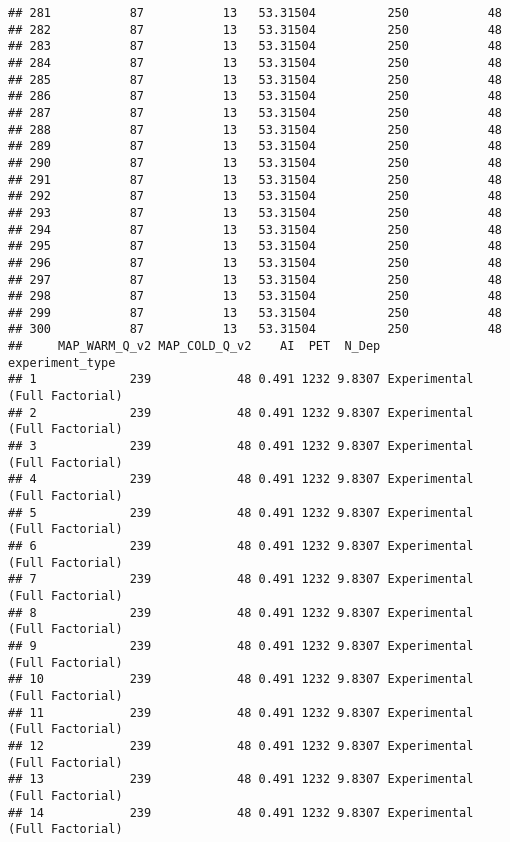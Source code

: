 \documentclass[]{article}
\begin{document}
\begin{verbatim}
## 281           87           13   53.31504          250           48
## 282           87           13   53.31504          250           48
## 283           87           13   53.31504          250           48
## 284           87           13   53.31504          250           48
## 285           87           13   53.31504          250           48
## 286           87           13   53.31504          250           48
## 287           87           13   53.31504          250           48
## 288           87           13   53.31504          250           48
## 289           87           13   53.31504          250           48
## 290           87           13   53.31504          250           48
## 291           87           13   53.31504          250           48
## 292           87           13   53.31504          250           48
## 293           87           13   53.31504          250           48
## 294           87           13   53.31504          250           48
## 295           87           13   53.31504          250           48
## 296           87           13   53.31504          250           48
## 297           87           13   53.31504          250           48
## 298           87           13   53.31504          250           48
## 299           87           13   53.31504          250           48
## 300           87           13   53.31504          250           48
##     MAP_WARM_Q_v2 MAP_COLD_Q_v2    AI  PET  N_Dep               experiment_type
## 1             239            48 0.491 1232 9.8307 Experimental (Full Factorial)
## 2             239            48 0.491 1232 9.8307 Experimental (Full Factorial)
## 3             239            48 0.491 1232 9.8307 Experimental (Full Factorial)
## 4             239            48 0.491 1232 9.8307 Experimental (Full Factorial)
## 5             239            48 0.491 1232 9.8307 Experimental (Full Factorial)
## 6             239            48 0.491 1232 9.8307 Experimental (Full Factorial)
## 7             239            48 0.491 1232 9.8307 Experimental (Full Factorial)
## 8             239            48 0.491 1232 9.8307 Experimental (Full Factorial)
## 9             239            48 0.491 1232 9.8307 Experimental (Full Factorial)
## 10            239            48 0.491 1232 9.8307 Experimental (Full Factorial)
## 11            239            48 0.491 1232 9.8307 Experimental (Full Factorial)
## 12            239            48 0.491 1232 9.8307 Experimental (Full Factorial)
## 13            239            48 0.491 1232 9.8307 Experimental (Full Factorial)
## 14            239            48 0.491 1232 9.8307 Experimental (Full Factorial)

\end{verbatim}
\end{document}
